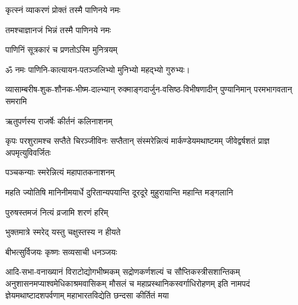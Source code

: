 \begin{center}

{कृत्स्नं व्याकरणं प्रोक्तं तस्मै पाणिनये नमः}

{तमश्चाज्ञानजं भिन्नं तस्मै पाणिनये नमः}

{पाणिनिं सूत्रकारं च प्रणतोऽस्मि मुनित्रयम्}

ॐ नमः पाणिनि-कात्यायन-पतञ्जलिभ्यो मुनिभ्यो महद्भ्यो गुरुभ्यः। 




{व्यासाम्बरीष-शुक-शौनक-भीष्म-दाल्भ्यान्}
{रुक्माङ्गदार्जुन-वसिष्ठ-विभीषणादीन्}
{पुण्यानिमान् परमभागवतान् समरामि}


{ऋतुपर्णस्य राजर्षेः कीर्तनं कलिनाशनम्}

{कृपः परशुरामश्च सप्तैते चिरञ्जीविनः}
{सप्तैतान् संस्मरेन्नित्यं मार्कण्डेयमथाष्टमम्}
{जीवेद्वर्षशतं प्राज्ञ अपमृत्युविवर्जितः}

{पञ्चकन्याः स्मरेन्नित्यं महापातकनाशनम्}

{महति ज्योतिषि मानिनीमयार्धे}
{दुरितान्यपयान्ति दूरदूरे}
{मुहुरायान्ति महान्ति मङ्गलानि}


{पुरुषस्तमजं नित्यं व्रजामि शरणं हरिम्}


{भुक्तमात्रे स्मरेद् यस्तु चक्षुस्तस्य न हीयते}


{बीभत्सुर्विजयः कृष्णः सव्यसाची धनञ्जयः}

\twolineshloka
{आदि-सभा-वनाख्यानं विराटोद्योगभीष्मकम्}
{सद्रोणकर्णशल्यं च सौप्तिकस्त्रीसशान्तिकम्}
\twolineshloka
{अनुशासनमप्याश्वमेधिकाश्रमवासिकम्}
{मौसलं च महाप्रस्थानिकस्वर्गाधिरोहणम्}
\vspace{-1em}
\twolineshloka
{इति नामपदं ज्ञेयमथाष्टादशपर्वणाम्}
{महाभारतविद्येति छन्दसा कीर्तितं मया}



\end{center}
